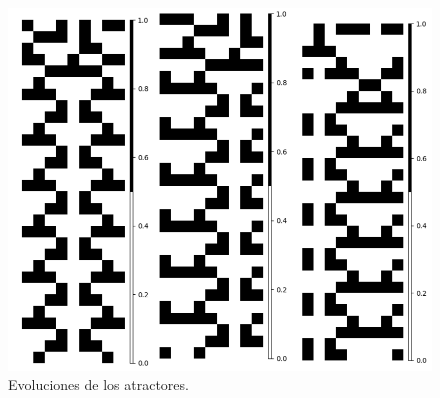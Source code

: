 \documentclass[11pt]{article}
\begin{document}
\begin{figure}[H]
			\includegraphics[scale=0.3]{resources/Atractores22/atractor_22_size_9_res2.png}
			\caption{Evoluciones de los atractores.}\label{fig:picture}
			\end{figure}
\end{document}
